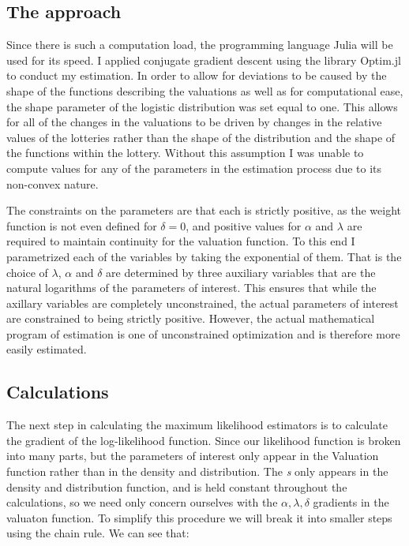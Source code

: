 \documentclass[12pt, letterpaper]{paper}
\begin{document}
\subsection{The approach}
\label{sec-4-2}
Since there is such a computation load, the programming language Julia
will be used for its speed. I applied conjugate gradient descent using
the library Optim.jl to conduct my estimation. In order to allow for
deviations to be caused by the shape of the functions describing the
valuations as well as for computational ease, the shape parameter of the
logistic distribution was set equal to one. This allows for all of the
changes in the valuations to be driven by changes in the relative
values of the lotteries rather than the shape of the distribution and
the shape of the functions within the lottery. Without this assumption
I was unable to compute values for any of the parameters in the
estimation process due to its non-convex nature.

The constraints on the parameters are that each is strictly
positive, as the weight function is not even defined for $\delta = 0$,
and positive values for $\alpha$ and $\lambda$ are required to maintain
continuity for the valuation function. To this end I parametrized each
of the variables by taking the exponential of them. That is the choice
of $\lambda$, $\alpha$ and $\delta$ are determined by three auxiliary
variables that are the natural logarithms of the parameters of
interest. This ensures that while the axillary variables are
completely unconstrained, the actual parameters of interest are
constrained to being strictly positive. However, the actual
mathematical program of estimation is one of unconstrained
optimization and is therefore more easily estimated.

\subsection{Calculations}
\label{sec-4-3}
The next step in calculating the maximum likelihood estimators is to
calculate the gradient of the log-likelihood function. Since our
likelihood function is broken into many parts, but the parameters of
interest only appear in the Valuation function rather than in the
density and distribution. The \emph{s} only appears in the density and
distribution function, and is held constant throughout the
calculations, so we need only concern ourselves with the $\alpha, \lambda, \delta$
gradients in the valuaton function. To simplify this procedure we will
break it into smaller steps using the chain rule. We can see that:
\end{document}
